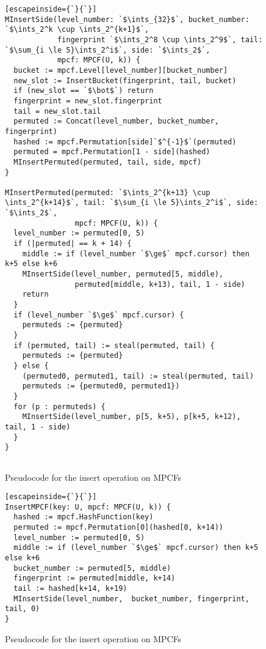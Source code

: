 \documentclass[letterpaper, 11pt]{article}
\newcommand{\ints}{\mathbb{Z}}
\begin{document}
\begin{figure}
\begin{lstlisting}[escapeinside={`}{`}]
MInsertSide(level_number: `$\ints_{32}$`, bucket_number: `$\ints_2^k \cup \ints_2^{k+1}$`,
            fingerprint `$\ints_2^8 \cup \ints_2^9$`, tail: `$\sum_{i \le 5}\ints_2^i$`, side: `$\ints_2$`,
            mpcf: MPCF(U, k)) {
  bucket := mpcf.Level[level_number][bucket_number]
  new_slot := InsertBucket(fingerprint, tail, bucket)
  if (new_slot == `$\bot$`) return
  fingerprint = new_slot.fingerprint
  tail = new_slot.tail
  permuted := Concat(level_number, bucket_number, fingerprint)
  hashed := mpcf.Permutation[side]`$^{-1}$`(permuted)
  permuted = mpcf.Permutation[1 - side](hashed)
  MInsertPermuted(permuted, tail, side, mpcf)
}

MInsertPermuted(permuted: `$\ints_2^{k+13} \cup \ints_2^{k+14}$`, tail: `$\sum_{i \le 5}\ints_2^i$`, side: `$\ints_2$`,
                mpcf: MPCF(U, k)) {
  level_number := permuted[0, 5)
  if (|permuted| == k + 14) {
    middle := if (level_number `$\ge$` mpcf.cursor) then k+5 else k+6
    MInsertSide(level_number, permuted[5, middle),
                permuted[middle, k+13), tail, 1 - side)
    return
  }
  if (level_number `$\ge$` mpcf.cursor) {
    permuteds := {permuted}
  }
  if (permuted, tail) := steal(permuted, tail) {
    permuteds := {permuted}
  } else {
    (permuted0, permuted1, tail) := steal(permuted, tail)
    permuteds := {permuted0, permuted1})
  }
  for (p : permuteds) {
    MInsertSide(level_number, p[5, k+5), p[k+5, k+12), tail, 1 - side)
  }
}


\end{lstlisting}
\caption{Pseudocode for the insert operation on MPCFs}
\end{figure}


\begin{figure}
\begin{lstlisting}[escapeinside={`}{`}]
InsertMPCF(key: U, mpcf: MPCF(U, k)) {
  hashed := mpcf.HashFunction(key)
  permuted := mpcf.Permutation[0](hashed[0, k+14))
  level_number := permuted[0, 5)
  middle := if (level_number `$\ge$` mpcf.cursor) then k+5 else k+6
  bucket_number := permuted[5, middle)
  fingerprint := permuted[middle, k+14)
  tail := hashed[k+14, k+19)
  MInsertSide(level_number,  bucket_number, fingerprint, tail, 0)
}
\end{lstlisting}
\caption{Pseudocode for the insert operation on MPCFs}
\end{figure}
\end{document}
